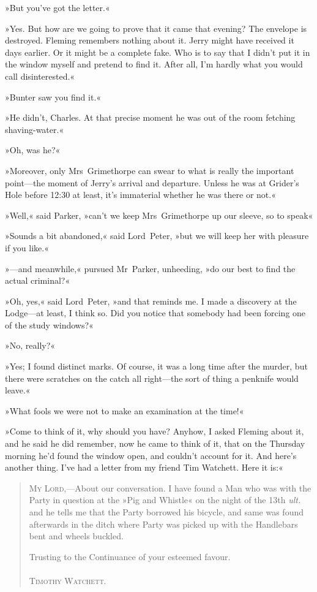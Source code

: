 »But you've got the letter.«

»Yes. But how are we going to prove that it came that evening? The envelope is destroyed. Fleming remembers nothing about it. Jerry might have received it days earlier. Or it might be a complete fake. Who is to say that I didn't put it in the window myself and pretend to find it. After all, I'm hardly what you would call disinterested.«

»Bunter saw you find it.«

»He didn't, Charles. At that precise moment he was out of the room fetching shaving-water.«

»Oh, was he?«

»Moreover, only Mrs~Grimethorpe can swear to what is really the important point—the moment of Jerry's arrival and departure. Unless he was at Grider's Hole before 12:30 at least, it's immaterial whether he was there or not.«

»Well,« said Parker, »can't we keep Mrs~Grimethorpe up our sleeve, so to speak\longdash«

»Sounds a bit abandoned,« said Lord~Peter, »but we will keep her with pleasure if you like.«

»—and meanwhile,« pursued Mr~Parker, unheeding, »do our best to find the actual criminal?«

»Oh, yes,« said Lord~Peter, »and that reminds me. I made a discovery at the Lodge—at least, I think so. Did you notice that somebody had been forcing one of the study windows?«

»No, really?«

»Yes; I found distinct marks. Of course, it was a long time after the murder, but there were scratches on the catch all right—the sort of thing a penknife would leave.«

»What fools we were not to make an examination at the time!«

»Come to think of it, why should you have? Anyhow, I asked Fleming about it, and he said he did remember, now he came to think of it, that on the Thursday morning he'd found the window open, and couldn't account for it. And here's another thing. I've had a letter from my friend Tim Watchett. Here it is:«

\begin{quote}
\textsc{My Lord},—About our conversation. I have found a Man who was with the Party in question at the »Pig and Whistle« on the night of the 13th \textit{ult.} and he tells me that the Party borrowed his bicycle, and same was found afterwards in the ditch where Party was picked up with the Handlebars bent and wheels buckled.

\begin{flushright}
\begin{minipage}{.5\textwidth}
Trusting to the Continuance of your esteemed favour.\\
~\\
\textsc{Timothy Watchett.}
\end{minipage}
\end{flushright}
\end{quote}

